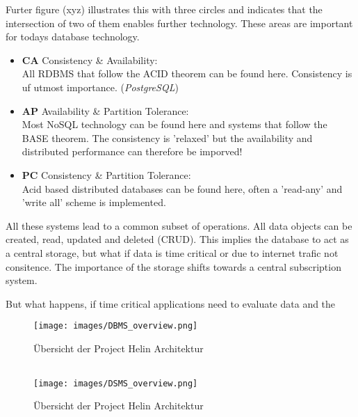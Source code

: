 Furter figure (xyz) illustrates this with three circles and indicates that the intersection of two of them enables further technology. These areas are important for todays database technology.


\begin{itemize}
	\item{\textbf{CA} Consistency \& Availability: \\
	All RDBMS that follow the ACID theorem can be found here. Consistency is uf utmost importance. (\textit{PostgreSQL})}
	\item{\textbf{AP} Availability \& Partition Tolerance: \\
	Most NoSQL technology can be found here and systems that follow the BASE theorem. The consistency is 'relaxed' but the availability and distributed performance can therefore be imporved! }
	\item{\textbf{PC} Consistency \& Partition Tolerance: \\
	Acid based distributed databases can be found here, often a 'read-any' and 'write all' scheme is implemented.}
\end{itemize}

All these systems lead to a common subset of operations. All data objects can be created, read, updated and deleted (CRUD). This implies the database to act as a central storage, but what if data is time critical or due to internet trafic not consitence. The importance of the storage shifts towards a central subscription system.

But what happens, if time critical applications need to evaluate data and the 
\begin{figure}[H]
	\centering
	\texttt{[image: images/DBMS\_overview.png]}
	\caption{Übersicht der Project Helin Architektur }
	\label{fig:architecture-overview}
\end{figure}

\begin{tabular}{lll}


\end{tabular}



\begin{figure}[H]
	\centering
	\texttt{[image: images/DSMS\_overview.png]}
	\caption{Übersicht der Project Helin Architektur }
	\label{fig:architecture-overview}
\end{figure}
